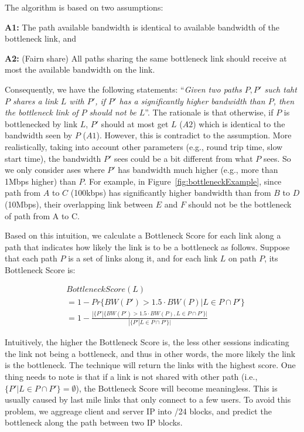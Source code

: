 The algorithm is based on two assumptions:
\begin{packeditemize}
	\item {\bf A1:} The path available bandwidth is identical to available bandwidth of the bottleneck link, and 
	\item {\bf A2:} (Fairn share) All paths sharing the same bottleneck link should receive at most the available bandwidth on the link.
\end{packeditemize}
Consequently, we have the following statements: ``{\it Given two paths $P,P'$ such taht $P$ shares a link $L$ with $P'$, if $P'$ has a significantly higher bandwidth than $P$, then the bottleneck link of $P$ should not be $L$}''. The rationale is that otherwise, if $P$ is bottlenecked by link $L$, $P'$ should at most get $L$ ($A2$) which is identical to the bandwidth seen by $P$ ($A1$). However, this is contradict to the assumption. 
More realistically, taking into account other parameters (e.g., round trip time, slow start time), the bandwidth $P'$ sees could be a bit different from what $P$ sees. So we only consider ases where $P'$ has bandwidth much higher (e.g., more than 1Mbps higher) than $P$. For example, in Figure~\ref{fig:bottleneckExample}, since path from  $A$ to $C$ (100kbps) has significantly higher bandwidth than from $B$ to $D$ (10Mbps), their overlapping link between $E$ and $F$ should not be the bottleneck of path from A to C.

Based on this intuition, we calculate a Bottleneck Score for each link along a path that indicates how likely the link is to be a bottleneck as follows. Suppose that each path $P$ is a set of links along it, and for each link $L$ on path $P$, its Bottleneck Score is:

\begin{align*}
&BottleneckScore(L)\\
&=1-Pr\{BW(P') > 1.5\cdot BW(P) | L \in P \cap P'\}\\
&=1-\frac{|\{P'|\{BW(P') > 1.5\cdot BW(P), L \in P \cap P'\}|}{|\{P'|L \in P \cap P'\}|}
\end{align*}

Intuitively, the higher the Bottleneck Score is, the less other sessions indicating the link not being a bottleneck, and thus in other words, the more likely the link is the bottleneck. The technique will return the links with the highest score. 
One thing needs to note is that if a link is not shared with other path (i.e., $\{P'|L\in P\cap P'\}=\emptyset$), the Bottleneck Score will become meaningless. This is usually caused by last mile links that only connect to a few users.
To avoid this problem, we aggreage client and server IP into /24 blocks, and predict the bottleneck along the path between two IP blocks. 


